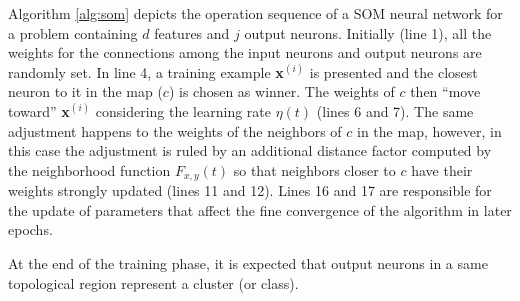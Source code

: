 Algorithm \ref{alg:som} depicts the operation sequence of a SOM neural network for a problem containing $d$ features and $j$ output neurons. Initially (line 1), all the weights for the connections among the input neurons and output neurons are randomly set. In line 4, a training example \textbf{x}$^{(i)}$ is presented and the closest neuron to it in the map ($c$) is chosen as winner. The weights of $c$ then 
``move toward'' \textbf{x}$^{(i)}$ considering the learning rate $\eta(t)$ (lines 6 and 7). The same adjustment happens to the weights of the neighbors of $c$ in the map, however, in this case the adjustment is ruled by an additional distance factor computed by the neighborhood function $F_{x,y}(t)$ so that neighbors closer to $c$ have their weights strongly updated (lines 11 and 12). Lines 16 and 17 are responsible for the update of parameters that affect the fine convergence of the algorithm in later epochs. 



At the end of the training phase, it is expected that output neurons in a same topological region represent a cluster (or class). 

